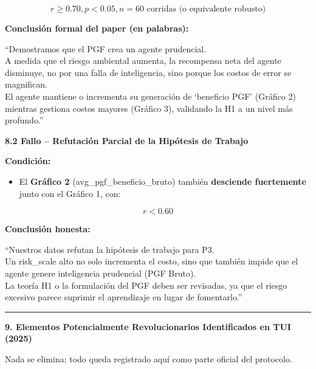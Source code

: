 \[r \geq 0.70,p < 0.05,n = 60\text{ corridas (o equivalente robusto)}
\]

\textbf{Conclusión formal del paper (en palabras):}

``Demostramos que el PGF crea un agente prudencial.\\
A medida que el riesgo ambiental aumenta, la recompensa neta del agente
disminuye, no por una falla de inteligencia, sino porque los costos de
error se magnifican.\\
El agente mantiene o incrementa su generación de `beneficio PGF'
(Gráfico 2) mientras gestiona costos mayores (Gráfico 3), validando la
H1 a un nivel más profundo.''

\textbf{8.2 Fallo -- Refutación Parcial de la Hipótesis de Trabajo}

\textbf{Condición:}

\begin{itemize}
\item
  El \textbf{Gráfico 2} (avg\_pgf\_beneficio\_bruto) también
  \textbf{desciende fuertemente} junto con el Gráfico 1, con:
\end{itemize}

\[r < 0.60
\]

\textbf{Conclusión honesta:}

``Nuestros datos refutan la hipótesis de trabajo para P3.\\
Un risk\_scale alto no solo incrementa el costo, sino que también impide
que el agente genere inteligencia prudencial (PGF Bruto).\\
La teoría H1 o la formulación del PGF deben ser revisadas, ya que el
riesgo excesivo parece suprimir el aprendizaje en lugar de fomentarlo.''

\begin{center}\rule{0.5\linewidth}{0.5pt}\end{center}

\textbf{9. Elementos Potencialmente Revolucionarios Identificados en TUI
(2025)}

Nada se elimina; todo queda registrado aquí como parte oficial del
protocolo.

